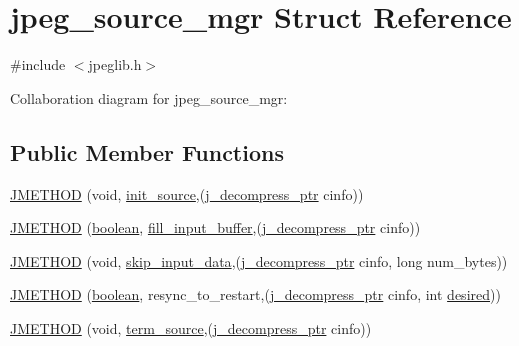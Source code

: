 \hypertarget{structjpeg__source__mgr}{}\section{jpeg\+\_\+source\+\_\+mgr Struct Reference}
\label{structjpeg__source__mgr}


{\ttfamily \#include $<$jpeglib.\+h$>$}



Collaboration diagram for jpeg\+\_\+source\+\_\+mgr\+:
\subsection*{Public Member Functions}
\begin{DoxyCompactItemize}
\item 
\mbox{\hyperlink{structjpeg__source__mgr_af8fda02c19c9dc4e505daabb77c3ad81}{J\+M\+E\+T\+H\+OD}} (void, \mbox{\hyperlink{jdatasrc_8c_ada3118e56d083499ce141e98ec116648}{init\+\_\+source}},(\mbox{\hyperlink{jpeglib_8h_a00c7d78af44bd26a901c791ccfc1e178}{j\+\_\+decompress\+\_\+ptr}} cinfo))
\item 
\mbox{\hyperlink{structjpeg__source__mgr_ab4a579b1f50108e2de73c7c0c1bbb9fd}{J\+M\+E\+T\+H\+OD}} (\mbox{\hyperlink{jmorecfg_8h_a7c6368b321bd9acd0149b030bb8275ed}{boolean}}, \mbox{\hyperlink{jdatasrc_8c_aa3542f61993ed4a526694556fac65941}{fill\+\_\+input\+\_\+buffer}},(\mbox{\hyperlink{jpeglib_8h_a00c7d78af44bd26a901c791ccfc1e178}{j\+\_\+decompress\+\_\+ptr}} cinfo))
\item 
\mbox{\hyperlink{structjpeg__source__mgr_a3e29df8ddadb0c15e54b69b5a7a10305}{J\+M\+E\+T\+H\+OD}} (void, \mbox{\hyperlink{jdatasrc_8c_ae539a6d1c36b54a0ef6168fecdc8379e}{skip\+\_\+input\+\_\+data}},(\mbox{\hyperlink{jpeglib_8h_a00c7d78af44bd26a901c791ccfc1e178}{j\+\_\+decompress\+\_\+ptr}} cinfo, long num\+\_\+bytes))
\item 
\mbox{\hyperlink{structjpeg__source__mgr_a60a35ccd1fb8d954f34c0cdbf29ac010}{J\+M\+E\+T\+H\+OD}} (\mbox{\hyperlink{jmorecfg_8h_a7c6368b321bd9acd0149b030bb8275ed}{boolean}}, resync\+\_\+to\+\_\+restart,(\mbox{\hyperlink{jpeglib_8h_a00c7d78af44bd26a901c791ccfc1e178}{j\+\_\+decompress\+\_\+ptr}} cinfo, int \mbox{\hyperlink{jpeglib_8h_a3450f7500f843178b4517d0e7ef2b537}{desired}}))
\item 
\mbox{\hyperlink{structjpeg__source__mgr_a6c0683ce1166b9ee659b2d3aa1efb1c2}{J\+M\+E\+T\+H\+OD}} (void, \mbox{\hyperlink{jdatasrc_8c_a0337cf4ba81c0f78c48b5de379cca33e}{term\+\_\+source}},(\mbox{\hyperlink{jpeglib_8h_a00c7d78af44bd26a901c791ccfc1e178}{j\+\_\+decompress\+\_\+ptr}} cinfo))
\end{DoxyCompactItemize}
